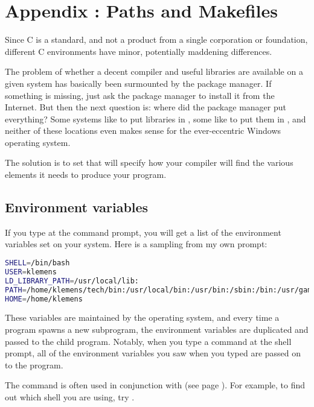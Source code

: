 \renewcommand\thechapter{\Alph{chapter}}
\setcounter{chapter}{1}
\setcounter{section}{0}
\setcounter{subsection}{0}
\setcounter{ex}{0}
\setcounter{lstlisting}{0}
\setcounter{figure}{0}
\chapter{Appendix \thechapter: Paths and Makefiles}

Since C is a standard, and not a product from a single corporation
or foundation, different C environments have minor, potentially maddening
differences. 

The problem of whether a decent compiler and useful libraries 
are available on a given system has basically been surmounted by the
package manager. If something is missing, just ask the package manager
to install it from the Internet.
But then the next question is: where did the package manager put
everything? Some systems like to put libraries in , some like
to put them in , and neither of these locations even makes
sense for the ever-eccentric Windows operating system.

The solution is to set  that will specify
how your compiler will find the various elements it needs to produce
your program.\label{makeappendix}

\section{Environment variables} If you type  at the command
prompt, you will get a list of the environment variables set on your
system. Here is a sampling from my own prompt: 
\begin{lstlisting}[language=sh]
SHELL=/bin/bash
USER=klemens
LD_LIBRARY_PATH=/usr/local/lib:
PATH=/home/klemens/tech/bin:/usr/local/bin:/usr/bin:/sbin:/bin:/usr/games:/sbin
HOME=/home/klemens
\end{lstlisting}

These variables are maintained by the operating system, and every time
a program spawns a new subprogram, the environment variables are duplicated
and passed to the child program.  Notably, when you type a command at the
shell prompt, all of the environment variables you saw when you typed
 are passed on to the program.

The  command is often used in conjunction with  (see
page \pageref{grep}). For example, to find out which shell you are using,
try .

